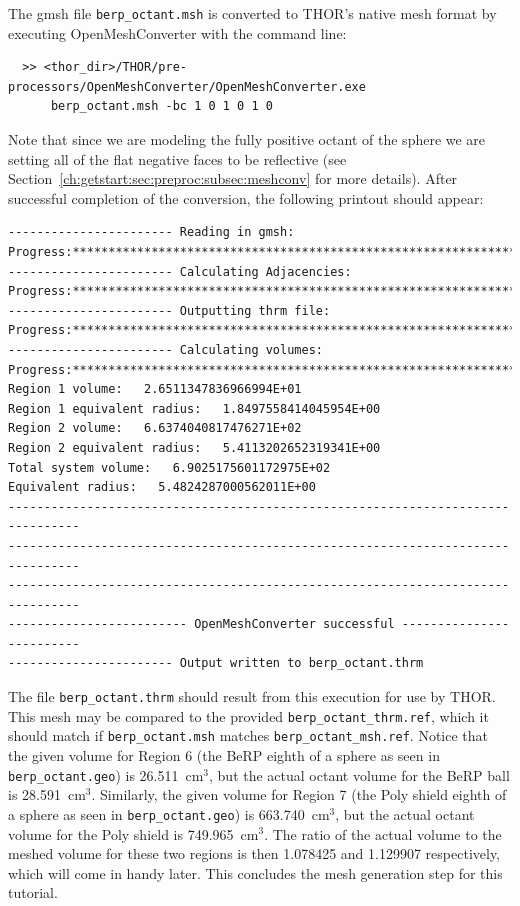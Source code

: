 The gmsh file \verb"berp_octant.msh" is converted to \ac{THOR}'s native mesh format by executing OpenMeshConverter with the command line:
\begin{verbatim}
  >> <thor_dir>/THOR/pre-processors/OpenMeshConverter/OpenMeshConverter.exe
      berp_octant.msh -bc 1 0 1 0 1 0
\end{verbatim}
Note that since we are modeling the fully positive octant of the sphere we are setting all of the flat negative faces to be reflective (see Section~\ref{ch:getstart:sec:preproc:subsec:meshconv} for more details).
After successful completion of the conversion, the following printout should appear:
\begin{verbatim}
----------------------- Reading in gmsh:
Progress:***********************************************************************
----------------------- Calculating Adjacencies:
Progress:***********************************************************************
----------------------- Outputting thrm file:
Progress:***********************************************************************
----------------------- Calculating volumes:
Progress:***********************************************************************
Region 1 volume:   2.6511347836966994E+01
Region 1 equivalent radius:   1.8497558414045954E+00
Region 2 volume:   6.6374040817476271E+02
Region 2 equivalent radius:   5.4113202652319341E+00
Total system volume:   6.9025175601172975E+02
Equivalent radius:   5.4824287000562011E+00
--------------------------------------------------------------------------------
--------------------------------------------------------------------------------
--------------------------------------------------------------------------------
------------------------- OpenMeshConverter successful -------------------------
----------------------- Output written to berp_octant.thrm
\end{verbatim}

The file \verb"berp_octant.thrm" should result from this execution for use by \ac{THOR}.
This mesh may be compared to the provided \verb"berp_octant_thrm.ref", which it should match if \verb"berp_octant.msh" matches \verb"berp_octant_msh.ref".
Notice that the given volume for Region 6 (the BeRP eighth of a sphere as seen in \verb"berp_octant.geo") is 26.511~cm$^3$, but the actual octant volume for the BeRP ball is 28.591~cm$^3$.
Similarly, the given volume for Region 7 (the Poly shield eighth of a sphere as seen in \verb"berp_octant.geo") is 663.740~cm$^3$, but the actual octant volume for the Poly shield is 749.965~cm$^3$.
The ratio of the actual volume to the meshed volume for these two regions is then 1.078425 and 1.129907 respectively, which will come in handy later.
This concludes the mesh generation step for this tutorial.

